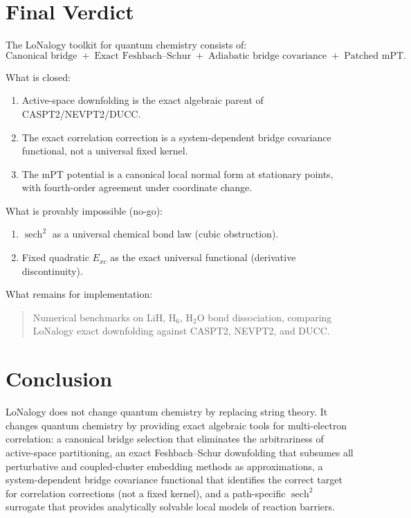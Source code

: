 \documentclass[12pt]{article}
\theoremstyle{plain}
\theoremstyle{definition}
\numberwithin{equation}{section}
\DeclareMathOperator{\sech}{sech}
\begin{document}
\section{Final Verdict}\label{sec:verdict}

The LoNalogy toolkit for quantum chemistry consists of:
\begin{equation}
\boxed{\text{Canonical bridge}\;+\;\text{Exact Feshbach--Schur}
\;+\;\text{Adiabatic bridge covariance}\;+\;\text{Patched mPT.}}
\end{equation}

What is closed:
\begin{enumerate}[label=(\Alph*)]
\item Active-space downfolding is the exact algebraic parent of
CASPT2/NEVPT2/DUCC.
\item The exact correlation correction is a system-dependent bridge
covariance functional, not a universal fixed kernel.
\item The mPT potential is a canonical local normal form at
stationary points, with fourth-order agreement under coordinate
change.
\end{enumerate}

What is provably impossible (no-go):
\begin{enumerate}[label=(\alph*)]
\item $\sech^2$ as a universal chemical bond law (cubic obstruction).
\item Fixed quadratic $E_{xc}$ as the exact universal functional
(derivative discontinuity).
\end{enumerate}

What remains for implementation:
\begin{quote}
Numerical benchmarks on LiH, H$_6$, H$_2$O bond dissociation,
comparing LoNalogy exact downfolding against CASPT2, NEVPT2, and
DUCC.
\end{quote}


\section*{Conclusion}

LoNalogy does not change quantum chemistry by replacing string
theory.  It changes quantum chemistry by providing exact algebraic
tools for multi-electron correlation: a canonical bridge selection
that eliminates the arbitrariness of active-space partitioning, an
exact Feshbach--Schur downfolding that subsumes all perturbative
and coupled-cluster embedding methods as approximations, a
system-dependent bridge covariance functional that identifies the
correct target for correlation corrections (not a fixed kernel),
and a path-specific $\sech^2$ surrogate that provides analytically
solvable local models of reaction barriers.
\end{document}
